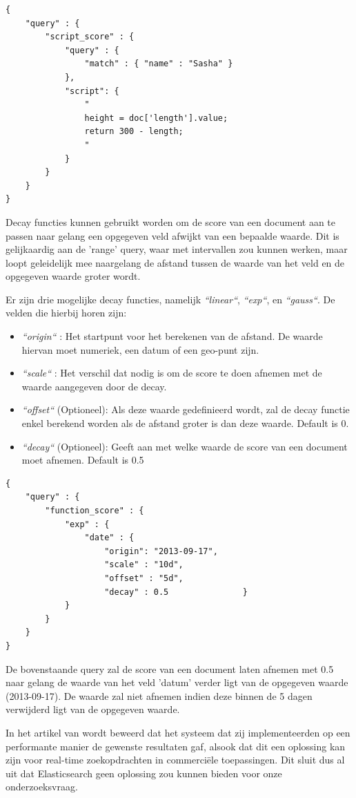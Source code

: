 \begin{lstlisting}[caption={Scoring: voorbeeld van een script\_score query}]
{
	"query" : {
		"script_score" : {
			"query" : {
				"match" : { "name" : "Sasha" }
			},
			"script": {
				"
				height = doc['length'].value;
				return 300 - length;
				"
			}
		}
	}
}
\end{lstlisting}

Decay functies kunnen gebruikt worden om de score van een document aan te passen naar gelang een opgegeven veld afwijkt van een bepaalde waarde. Dit is gelijkaardig aan de 'range' query, waar met intervallen zou kunnen werken, maar loopt geleidelijk mee naargelang de afstand tussen de waarde van het veld en de opgegeven waarde groter wordt. 
\newline

Er zijn drie mogelijke decay functies, namelijk \textit{``linear``}, \textit{``exp``}, en \textit{``gauss``}. De velden die hierbij horen zijn:

\begin{itemize}
	\item \textit{``origin``} : Het startpunt voor het berekenen van de afstand. De waarde hiervan moet numeriek, een datum of een geo-punt zijn.
	\item \textit{``scale``} : Het verschil dat nodig is om de score te doen afnemen met de waarde aangegeven door de decay.
	\item \textit{``offset``} (Optioneel):  Als deze waarde gedefinieerd wordt, zal de decay functie enkel berekend worden als de afstand groter is dan deze waarde. Default is 0.
	\item \textit{``decay``} (Optioneel): Geeft aan met welke waarde de score van een document moet afnemen. Default is 0.5
\end{itemize}


\begin{lstlisting}[caption={Decay: voorbeeld van een decay functie}]
{
	"query" : {
		"function_score" : {
			"exp" : {
				"date" : {
					"origin": "2013-09-17",
					"scale" : "10d",
					"offset" : "5d",
					"decay" : 0.5				}
			}
		}
	}
}
\end{lstlisting}

De bovenstaande query zal de score van een document laten afnemen met 0.5 naar gelang de waarde van het veld 'datum' verder ligt van de opgegeven waarde (2013-09-17). De waarde zal niet afnemen indien deze binnen de 5 dagen verwijderd ligt van de opgegeven waarde.

 In het artikel van \autocite{Vavliakis2019} wordt beweerd dat het systeem dat zij implementeerden op een performante manier de gewenste resultaten gaf, alsook dat dit een oplossing kan zijn voor real-time zoekopdrachten in commerciële toepassingen. Dit sluit dus al uit dat Elasticsearch geen oplossing zou kunnen bieden voor onze onderzoeksvraag.
 
